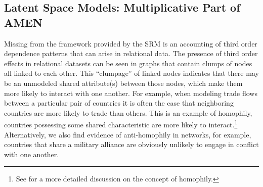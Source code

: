

\subsection{Latent Space Models: Multiplicative Part of AMEN}

Missing from the framework provided by the SRM is an accounting of third order dependence patterns that can arise in relational data. The presence of third order effects in relational datasets can be seen in graphs that contain clumps of nodes all linked to each other. This ``clumpage'' of linked nodes indicates that there may be an unmodeled shared attribute(s) between those nodes, which make them more likely to interact with one another. For example, when modeling trade flows between a particular pair of countries it is often the case that neighboring countries are more likely to trade than others. This is an example of homophily, countries possessing some shared characteristic are more likely to interact.\footnote{See \citet{shalizi:thomas:2011} for a more detailed discussion on the concept of homophily.} Alternatively, we also find evidence of anti-homophily in networks, for example, countries that share a military alliance are obviously unlikely to engage in conflict with one another. 

